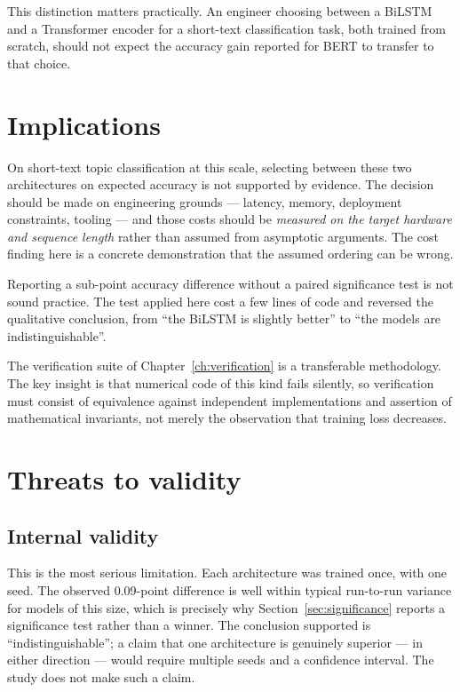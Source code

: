 This distinction matters practically. An engineer choosing between a BiLSTM and a Transformer
encoder for a short-text classification task, both trained from scratch, should not expect the
accuracy gain reported for BERT to transfer to that choice.

\section{Implications}

 On short-text topic classification at this scale, selecting between these
two architectures on expected accuracy is not supported by evidence. The decision should be made on
engineering grounds --- latency, memory, deployment constraints, tooling --- and those costs should
be \emph{measured on the target hardware and sequence length} rather than assumed from asymptotic
arguments. The cost finding here is a concrete demonstration that the assumed ordering can be
wrong.

 Reporting a sub-point accuracy difference without a paired
significance test is not sound practice. The test applied here cost a few lines of code and
reversed the qualitative conclusion, from ``the BiLSTM is slightly better'' to ``the models are
indistinguishable''.

 The verification suite of
Chapter~\ref{ch:verification} is a transferable methodology. The key insight is that numerical code
of this kind fails silently, so verification must consist of equivalence against independent
implementations and assertion of mathematical invariants, not merely the observation that training
loss decreases.

\section{Threats to validity}
\label{sec:threats}

\subsection{Internal validity}

 This is the most serious limitation. Each architecture was trained once,
with one seed. The observed 0.09-point difference is well within typical run-to-run variance for
models of this size, which is precisely why Section~\ref{sec:significance} reports a significance
test rather than a winner. The conclusion supported is ``indistinguishable''; a claim that one
architecture is genuinely superior --- in either direction --- would require multiple seeds and a
confidence interval. The study does not make such a claim.

